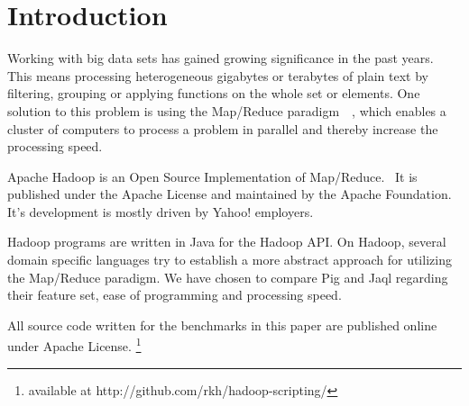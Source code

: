 \section{Introduction}

Working with big data sets has gained growing significance in the past years. This means processing heterogeneous gigabytes or terabytes of plain text by filtering, grouping or applying functions on the whole set or elements. One solution to this problem is using the Map/Reduce paradigm~\cite{googleMapReduce}~, which enables a cluster of computers to process a problem in parallel and thereby increase the processing speed.

Apache Hadoop is an Open Source Implementation of Map/Reduce.~\cite{hadoopWebsite} It is published under the Apache License and maintained by the Apache Foundation. It's development is mostly driven by Yahoo! employers.

Hadoop programs are written in Java for the Hadoop API. On Hadoop, several domain specific languages try to establish a more abstract approach for utilizing the Map/Reduce paradigm. We have chosen to compare Pig and Jaql regarding their feature set, ease of programming and processing speed.

All source code written for the benchmarks in this paper are published online under Apache License. \footnote{available at http://github.com/rkh/hadoop-scripting/}